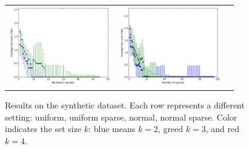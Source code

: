 \documentclass{article}
\renewcommand\[{\begin{equation}}
\renewcommand\]{\end{equation}}
\begin{document}
\begin{figure}[b]
\begin{tabular}{ccc}
        \includegraphics[width=12em]{figures/synthetic_4_normal_sparse} &
        \includegraphics[width=12em]{figures/synthetic_5_normal_sparse}
    \end{tabular}
    \caption{Results on the synthetic dataset. Each row represents a different
    setting: uniform, uniform sparse, normal, normal sparse. Color indicates
    the set size $k$: blue means $k=2$, greed $k=3$, and red $k=4$.}
\end{figure}

\twocolumn
\end{document}
